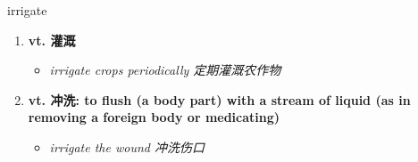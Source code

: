 
\begin{frame}
{\huge irrigate}
\begin{center}
\begin{enumerate}\Large
  \item \textbf{vt. 灌溉}
  \begin{itemize}
    \item \em{\Large{irrigate crops periodically 定期灌溉农作物}}
  \end{itemize}
  \item \textbf{vt. 冲洗: to flush (a body part) with a stream of liquid (as in removing a foreign body or medicating)}
  \begin{itemize}
    \item \em{\Large{irrigate the wound 冲洗伤口}}
  \end{itemize}
\end{enumerate}
\end{center}
\end{frame}
